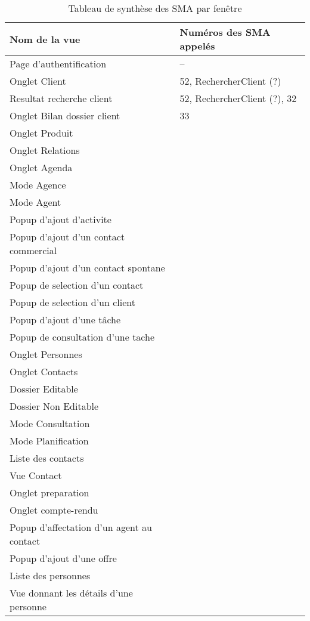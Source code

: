 \begin{table}
    \centering
    \begin{tabular}{l|l}
    Nom de la vue   & Numéros des SMA appelés   \\ \hline
    Page d'authentification & -- \\
    Onglet Client & 52, RechercherClient (?)\\
    Resultat recherche client & 52, RechercherClient (?), 32\\
    Onglet Bilan dossier client & 33\\
    Onglet Produit & \\
    Onglet Relations & \\
    Onglet Agenda & \\
    Mode Agence & \\
    Mode Agent & \\
    Popup d'ajout d'activite & \\
    Popup d'ajout d'un contact commercial & \\
    Popup d'ajout d'un contact spontane & \\
    Popup de selection d'un contact & \\
    Popup de selection d'un client & \\
    Popup d'ajout d'une tâche & \\
    Popup de consultation d'une tache & \\
    Onglet Personnes & \\
    Onglet Contacts & \\
    Dossier Editable & \\ 
    Dossier Non Editable & \\
    Mode Consultation & \\
    Mode Planification & \\
    Liste des contacts & \\
    Vue Contact & \\
    Onglet preparation  & \\
    Onglet compte-rendu & \\
    Popup d'affectation d'un agent au contact & \\
    Popup d'ajout d'une offre & \\
    Liste des personnes & \\
    Vue donnant les détails d'une personne  & \\
    \end{tabular}
    \caption{Tableau de synthèse des SMA par fenêtre}
\end{table}



